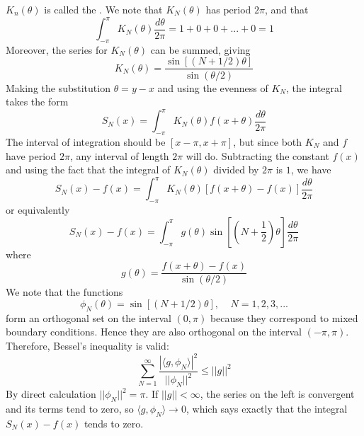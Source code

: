 $K_n(\theta)$ is called the . We note that $K_N(\theta)$ has period $2\pi$, and that \begin{equation*}
    \int_{-\pi}^{\pi}K_N(\theta)\frac{d\theta}{2\pi} = 1+0+0+...+0 = 1
\end{equation*}
Moreover, the series for $K_N(\theta)$ can be summed, giving \begin{equation*}
    K_N(\theta) = \frac{\sin[(N+1/2)\theta]}{\sin(\theta/2)}
\end{equation*}
Making the substitution $\theta = y-x$ and using the evenness of $K_N$, the integral takes the form \begin{equation*}
    S_N(x) = \int_{-\pi}^{\pi}K_N(\theta)f(x+\theta)\frac{d\theta}{2\pi}
\end{equation*}
The interval of integration should be $[x-\pi,x+\pi]$, but since both $K_N$ and $f$ have period $2\pi$, any interval of length $2\pi$ will do. Subtracting the constant $f(x)$ and using the fact that the integral of $K_N(\theta)$ divided by $2\pi$ is $1$, we have \begin{equation*}
    S_N(x) - f(x) = \int_{-\pi}^{\pi}K_N(\theta)[f(x+\theta)-f(x)]\frac{d\theta}{2\pi}
\end{equation*}
or equivalently \begin{equation*}
    S_N(x) - f(x) = \int_{-\pi}^{\pi}g(\theta)\sin\left[\left(N+\frac{1}{2}\right)\theta\right]\frac{d\theta}{2\pi}
\end{equation*}
where \begin{equation*}
    g(\theta) = \frac{f(x+\theta)-f(x)}{\sin(\theta/2)}
\end{equation*}
We note that the functions \begin{equation*}
    \phi_N(\theta) = \sin[(N+1/2)\theta],\;\;\;\;N=1,2,3,...
\end{equation*}
form an orthogonal set on the interval $(0,\pi)$ because they correspond to mixed boundary conditions. Hence they are also orthogonal on the interval $(-\pi,\pi)$. Therefore, Bessel's inequality is valid: \begin{equation*}
    \sum_{N=1}^{\infty}\frac{|\langle g,\phi_N\rangle|^2}{||\phi_N||^2} \leq ||g||^2
\end{equation*}
By direct calculation $||\phi_N||^2 = \pi$. If $||g|| < \infty$, the series on the left is convergent and its terms tend to zero, so $\langle g,\phi_N\rangle \rightarrow 0$, which says exactly that the integral $S_N(x) - f(x)$ tends to zero.

